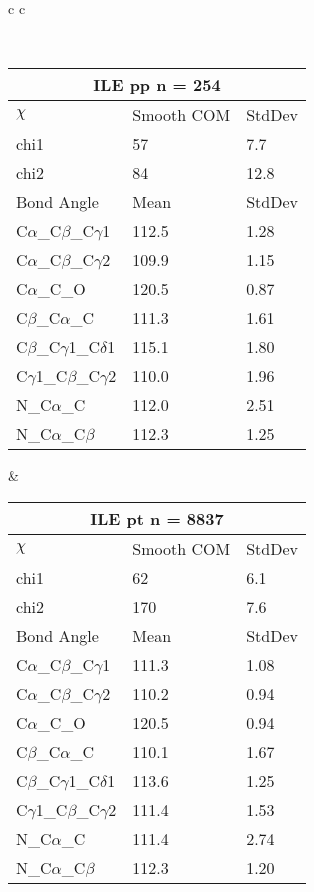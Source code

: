 \begin{longtable}{ c c }

\caption{ILE Central Values}\\
  \begin{tabular}{ l l l }
  \toprule
  \multicolumn{3}{c}{ILE \textbf{pp} n = 254} \\ \toprule
  $\chi$       & Smooth COM & StdDev \\ \midrule
  chi1 & 57 & 7.7 \\ 
  chi2 & 84 & 12.8 \\ \midrule
  Bond Angle   & Mean     & StdDev \\ \midrule
  C$\alpha$\_C$\beta$\_C$\gamma$1 & 112.5 & 1.28\\
  C$\alpha$\_C$\beta$\_C$\gamma$2 & 109.9 & 1.15\\
  C$\alpha$\_C\_O & 120.5 & 0.87\\
  C$\beta$\_C$\alpha$\_C & 111.3 & 1.61\\
  C$\beta$\_C$\gamma$1\_C$\delta$1 & 115.1 & 1.80\\
  C$\gamma$1\_C$\beta$\_C$\gamma$2 & 110.0 & 1.96\\
  N\_C$\alpha$\_C & 112.0 & 2.51\\
  N\_C$\alpha$\_C$\beta$ & 112.3 & 1.25\\
  \bottomrule
  \end{tabular}
  &
  \begin{tabular}{ l l l }
  \toprule
  \multicolumn{3}{c}{ILE \textbf{pt} n = 8837} \\ \toprule
  $\chi$       & Smooth COM & StdDev \\ \midrule
  chi1 & 62 & 6.1 \\ 
  chi2 & 170 & 7.6 \\ \midrule
  Bond Angle   & Mean     & StdDev \\ \midrule
  C$\alpha$\_C$\beta$\_C$\gamma$1 & 111.3 & 1.08\\
  C$\alpha$\_C$\beta$\_C$\gamma$2 & 110.2 & 0.94\\
  C$\alpha$\_C\_O & 120.5 & 0.94\\
  C$\beta$\_C$\alpha$\_C & 110.1 & 1.67\\
  C$\beta$\_C$\gamma$1\_C$\delta$1 & 113.6 & 1.25\\
  C$\gamma$1\_C$\beta$\_C$\gamma$2 & 111.4 & 1.53\\
  N\_C$\alpha$\_C & 111.4 & 2.74\\
  N\_C$\alpha$\_C$\beta$ & 112.3 & 1.20\\
  \bottomrule
  \end{tabular}

\end{longtable}
